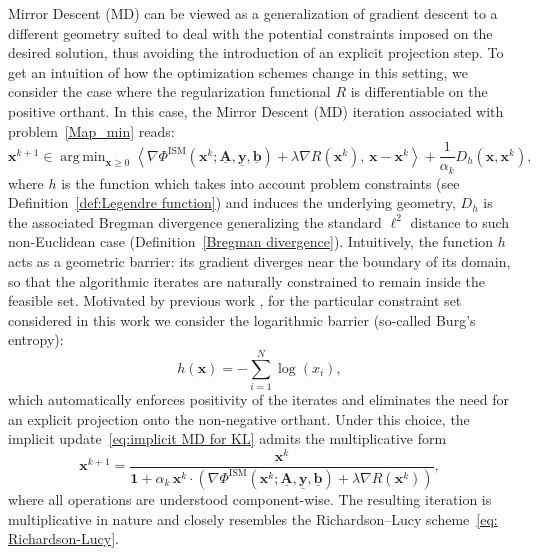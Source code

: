 \documentclass[letterpaper]{article}
\DeclareMathOperator*{\argmin}{arg\,min}
\begin{document}
Mirror Descent (MD) can be viewed as a generalization of gradient descent to a %
different geometry suited to deal with the potential constraints imposed on the desired solution,
thus avoiding the introduction of an explicit projection step. To get an intuition of how the optimization schemes change in this setting, we consider the case where the regularization functional $R$ is differentiable on the positive orthant. In this case, the Mirror Descent (MD) \cite{nemirovskii_yudin_1983} iteration associated with problem~\eqref{Map_min} reads:
\begin{equation}
\mathbf{x}^{k+1}
\in
\argmin_{\mathbf{x}\geq0}
\left\langle
\nabla\Phi^{\mathrm{ISM}}
(\mathbf{x}^k;\underline{\mathbf A},\underline{\mathbf y},\underline{\mathbf{b}})
+
\lambda\nabla R(\mathbf{x}^k),
\,
\mathbf{x}-\mathbf{x}^k
\right\rangle
+
\frac{1}{\alpha_k}
D_h(\mathbf{x},\mathbf{x}^k), \label{eq:implicit MD for KL}
\end{equation}
where $h$ is the function which takes into account problem constraints (see Definition~\ref{def:Legendre function}) and induces the underlying geometry,  $D_h$ is the associated Bregman divergence generalizing the standard $\ell^2$ distance to such non-Euclidean case (Definition~\ref{Bregman divergence}). Intuitively, the function $h$ acts as a geometric barrier: its gradient diverges near the boundary of its domain, so that the algorithmic iterates are naturally constrained to remain inside the feasible set. 
Motivated by previous work \cite{Bolte2018}, for the particular constraint set considered in this work we consider the logarithmic barrier (so-called Burg's entropy):
\begin{equation}
    h(\mathbf{x})
=
-\sum_{i=1}^{N}\log(x_i), \label{eq: burg's entropy}
\end{equation}
which automatically enforces positivity of the iterates and eliminates the need for an explicit projection onto the non-negative orthant. Under this choice, the implicit update~\eqref{eq:implicit MD for KL} admits the multiplicative form~\cite{nolip}
\begin{equation}
\label{eq:explicit_md_step}
\mathbf{x}^{k+1}
=
\frac{
\mathbf{x}^{k}
}{
\mathbf 1
+
\alpha_k\,\mathbf{x}^k
\cdot
\left(
\nabla\Phi^{\mathrm{ISM}}
(\mathbf{x}^k;\underline{\mathbf A},\underline{\mathbf y},\underline{\mathbf{b}})
+
\lambda\nabla R(\mathbf{x}^k)
\right)
},
\end{equation}
where all operations are understood component-wise. The resulting iteration is multiplicative in nature and closely resembles the Richardson--Lucy scheme~\eqref{eq: Richardson-Lucy}.
\end{document}
